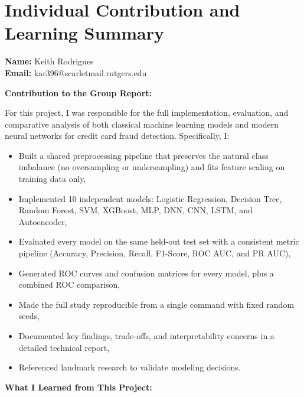 \documentclass[journal]{IEEEtran}
\begin{document}
\onecolumn
\section*{Individual Contribution and Learning Summary}
\noindent\textbf{Name:} Keith Rodrigues\\
\textbf{Email:} kar396@scarletmail.rutgers.edu

\medskip
\noindent\textbf{Contribution to the Group Report:}

\noindent For this project, I was responsible for the full implementation, evaluation, and comparative analysis of both classical machine learning models and modern neural networks for credit card fraud detection. Specifically, I:
\begin{itemize}
  \item Built a shared preprocessing pipeline that preserves the natural class imbalance (no oversampling or undersampling) and fits feature scaling on training data only,
  \item Implemented 10 independent models: Logistic Regression, Decision Tree, Random Forest, SVM, XGBoost, MLP, DNN, CNN, LSTM, and Autoencoder,
  \item Evaluated every model on the same held-out test set with a consistent metric pipeline (Accuracy, Precision, Recall, F1-Score, ROC AUC, and PR AUC),
  \item Generated ROC curves and confusion matrices for every model, plus a combined ROC comparison,
  \item Made the full study reproducible from a single command with fixed random seeds,
  \item Documented key findings, trade-offs, and interpretability concerns in a detailed technical report,
  \item Referenced landmark research to validate modeling decisions.
\end{itemize}

\noindent\textbf{What I Learned from This Project:}
\end{document}
